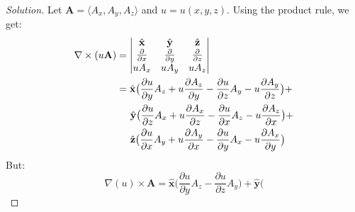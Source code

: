             \begin{proof}[Solution]
                Let $\mathbf{A}=\langle{A_{x},A_{y},A_{z}}\rangle$
                and $u=u(x,y,z)$.
                Using the product rule, we get:
                \begin{align*}
                    \nabla\times (u\mathbf{A})
                    &=
                    \begin{vmatrix}
                        \hat{\mathbf{x}}
                        &\hat{\mathbf{y}}
                        &\hat{\mathbf{z}}\\
                        \frac{\partial}{\partial{x}}
                        &\frac{\partial}{\partial{y}}
                        &\frac{\partial}{\partial{z}}\\
                        uA_{x}
                        &uA_{y}
                        &uA_{z}
                    \end{vmatrix}\\
                    &=\hat{\mathbf{x}}\big(
                        \frac{\partial{u}}{\partial{y}}A_{z}
                        +u\frac{\partial{A_{z}}}{\partial{y}}
                        -\frac{\partial{u}}{\partial{z}}A_{y}
                        -u\frac{\partial{A_{y}}}{\partial{z}}
                    \big)+\\
                    &\hspace{1.4em}\hat{\mathbf{y}}\big(
                        \frac{\partial{u}}{\partial{z}}A_{x}
                        +u\frac{\partial{A_{x}}}{\partial{z}}
                        -\frac{\partial{u}}{\partial{x}}A_{z}
                        -u\frac{\partial{A_{z}}}{\partial{x}}
                    \big)+\\
                    &\hspace{1.4em}
                    \hat{\mathbf{z}}\big(
                        \frac{\partial{u}}{\partial{x}}A_{y}+
                        u\frac{\partial{A_{y}}}{\partial{x}}
                        -\frac{\partial{u}}{\partial{y}}A_{x}
                        -u\frac{\partial{A_{x}}}{\partial{y}}
                    \big)
                \end{align*}
                But:
                \begin{equation*}
                    \nabla(u)\times\mathbf{A}
                    =\hat{\mathbf{x}}\big(
                        \frac{\partial u}{\partial y}
                        A_{z}-\frac{\partial u}{\partial z}A_{y}
                    \big)
                    +\hat{\mathbf{y}}\big(

\end{equation*}
\end{proof}
